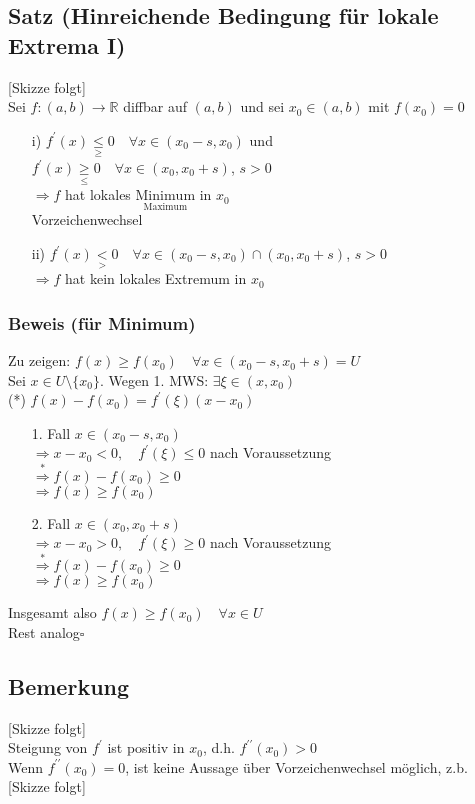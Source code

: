 \documentclass[12pt, titlepage]{article}
\newcommand{\R}{\mathds{R}}
\renewcommand{\>}{\rightarrow}
\renewcommand{\*}{\cdot}
\begin{document}
	\subsection{Satz (Hinreichende Bedingung für lokale Extrema I)}
	[Skizze folgt]\\
	Sei $f\colon(a,b)\>\R$ diffbar auf $(a,b)$ und sei $x_0\in(a,b)$ mit $f(x_0)=0$
	\begin{itemize}
		\item[i)] $f^\prime(x)\underset{\geq}{\leq}0\quad\forall x\in(x_0-s,x_0)$ und\\
		$f^\prime(x)\underset{\leq}{\geq}0\quad\forall x\in(x_0,x_0+s)$, $s>0$\\
		$\Rightarrow f$ hat lokales $\underset{\textrm{Maximum}}{\textrm{Minimum}}$ in $x_0$\\
		Vorzeichenwechsel
		\item[ii)] $f^\prime(x)\underset{>}{<}0\quad\forall x\in(x_0-s,x_0)\cap(x_0,x_0+s)$, $s>0$\\
		$\Rightarrow f$ hat kein lokales Extremum in $x_0$
	\end{itemize}
	\subsubsection*{Beweis (für Minimum)}
	Zu zeigen: $f(x)\geq f(x_0)\quad\forall x\in(x_0-s,x_0+s)=U$\\
	Sei $x\in U\setminus\{x_0\}$. Wegen 1. MWS: $\exists\xi\in(x,x_0)$\\
	(*) $f(x)-f(x_0)=f^\prime(\xi)(x-x_0)$
	\begin{itemize}
		\item[1. Fall] $x\in(x_0-s,x_0)$\\
		$\Rightarrow x-x_0<0,\quad f^\prime(\xi)\leq0$ nach Voraussetzung\\
		$\overset{*}{\Rightarrow} f(x)-f(x_0)\geq0$\\
		$\Rightarrow f(x)\geq f(x_0)$
		\item[2. Fall] $x\in(x_0,x_0+s)$\\
		$\Rightarrow x-x_0>0,\quad f^\prime(\xi)\geq0$ nach Voraussetzung\\
		$\overset{*}{\Rightarrow} f(x)-f(x_0)\geq0$\\
		$\Rightarrow f(x)\geq f(x_0)$
	\end{itemize}
	Insgesamt also $f(x)\geq f(x_0)\quad\forall x\in U$\\
	Rest analog\hfill$\square$
	\subsection{Bemerkung}
	[Skizze folgt]\\
	Steigung von $f^\prime$ ist positiv in $x_0$, d.h. $f^{\prime\prime}(x_0)>0$\\
	Wenn $f^{\prime\prime}(x_0)=0$, ist keine Aussage über Vorzeichenwechsel möglich, z.b. [Skizze folgt]
\end{document}
